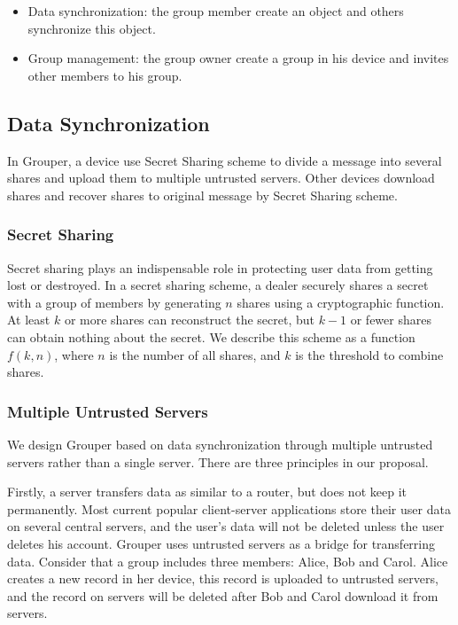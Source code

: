 \documentclass[twocolumn,10pt]{article}
\begin{document}
\begin{itemize}
	\setlength{\itemsep}{1pt}
	\setlength{\parskip}{0pt}
	\setlength{\parsep}{0pt}
	\item Data synchronization: the group member create an object and others synchronize this object.
	\item Group management: the group owner create a group in his device and invites other members to his group.
\end{itemize}

\subsection{Data Synchronization}

In Grouper, a device use Secret Sharing scheme to divide a message into several shares and upload them to multiple untrusted servers. Other devices download shares and recover shares to original message by Secret Sharing scheme.

\subsubsection{Secret Sharing}
Secret sharing plays an indispensable role in protecting user data from getting lost or destroyed. In a secret sharing scheme, a dealer securely shares a secret with a group of members by generating $n$ shares using a cryptographic function\cite{smith2013layered}. At least $k$ or more shares can reconstruct the secret, but $k-1$ or fewer shares can obtain nothing about the secret\cite{pang2005new}. We describe this scheme as a function $f(k, n)$, where $n$ is the number of all shares, and $k$ is the threshold to combine shares. 

\subsubsection{Multiple Untrusted Servers}

We design Grouper based on data synchronization through multiple untrusted servers rather than a single server. There are three principles in our proposal. 

Firstly, a server transfers data as similar to a router, but does not keep it permanently. Most current popular client-server applications store their user data on several central servers, and the user's data will not be deleted unless the user deletes his account. Grouper uses untrusted servers as a bridge for transferring data. Consider that a group includes three members: Alice, Bob and Carol. Alice creates a new record in her device, this record is uploaded to untrusted servers, and the record on servers will be deleted after Bob and Carol download it from servers.
\end{document}
